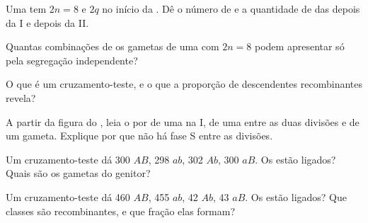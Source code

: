 \begin{exercise}[$\star$]\label{exo:g12:meiosis-genetic-shuffling:3}
Uma  tem $2n = 8$ e  $2q$ no início da . Dê o número de
 e a quantidade de  das  depois da  I e
depois da  II.
\end{exercise}

\begin{exercise}[$\star$]\label{exo:g12:meiosis-genetic-shuffling:4}
Quantas combinações de  os gametas de uma  com
$2n = 8$ podem apresentar só pela segregação independente?
\end{exercise}

\begin{exercise}[$\star$]\label{exo:g12:meiosis-genetic-shuffling:5}
O que é um cruzamento-teste, e o que a proporção de descendentes
recombinantes revela?
\end{exercise}

\begin{exercise}[$\star\star$]\label{exo:g12:meiosis-genetic-shuffling:6}
A partir da figura do , leia o  por  de uma  na
 I, de uma  entre as duas divisões e de um gameta. Explique
por que não há fase S entre as divisões.
\end{exercise}

\begin{exercise}[$\star\star$]\label{exo:g12:meiosis-genetic-shuffling:7}
Um cruzamento-teste dá 300 $AB$, 298 $ab$, 302 $Ab$, 300 $aB$. Os 
estão ligados? Quais são os gametas do genitor?
\end{exercise}

\begin{exercise}[$\star\star$]\label{exo:g12:meiosis-genetic-shuffling:8}
Um cruzamento-teste dá 460 $AB$, 455 $ab$, 42 $Ab$, 43 $aB$. Os 
estão ligados? Que classes são recombinantes, e que fração elas formam?
\end{exercise}

